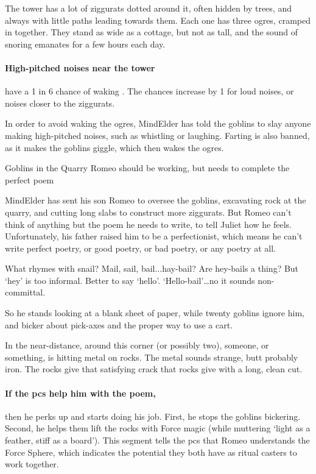 The tower has a lot of ziggurats dotted around it, often hidden by trees, and always with little paths leading towards them.
Each one has three ogres, cramped in together.
They stand as wide as a cottage, but not as tall, and the sound of snoring emanates for a few hours each day.

\paragraph{High-pitched noises near the tower}
have a 1 in 6 chance of waking .
The chances increase by 1 for loud noises, or noises closer to the ziggurats.

In order to avoid waking the ogres, \gls{MindElder} has told the goblins to slay anyone making high-pitched noises, such as whistling or laughing.
Farting is also banned, as it makes the goblins giggle, which then wakes the ogres.

{Goblins in the Quarry}%
{Romeo should be working, but needs to complete the perfect poem}%


\Gls{MindElder} has sent his son Romeo to oversee the goblins, excavating rock at the quarry, and cutting long slabs to construct more ziggurats.
But Romeo can't think of anything but the poem he needs to write, to tell Juliet how he feels.
Unfortunately, his father raised him to be a perfectionist, which means he can't write perfect poetry, or good poetry, or bad poetry, or any poetry at all.

\begin{speechtext}
  What rhymes with snail?
  Mail, sail, bail...hay-bail?
  Are hey-bails a thing?
  But `hey' is too informal.
  Better to say `hello'.
  `Hello-bail'\ldots no it sounds non-committal.
\end{speechtext}

So he stands looking at a blank sheet of paper, while twenty goblins ignore him, and bicker about pick-axes and the proper way to use a cart.

\begin{boxtext}
  In the near-distance, around this corner (or possibly two), someone, or something, is hitting metal on rocks.
  The metal sounds strange, butt probably iron.
  The rocks give that satisfying crack that rocks give with a long, clean cut.
\end{boxtext}

\paragraph{If the \glspl{pc} help him with the poem,}
then he perks up and starts doing his job.
First, he stops the goblins bickering.
Second, he helps them lift the rocks with Force magic (while muttering `light as a feather, stiff as a board').
This \gls{segment} tells the \glspl{pc} that Romeo understands the Force Sphere, which indicates the potential they both have as ritual casters to work together.

